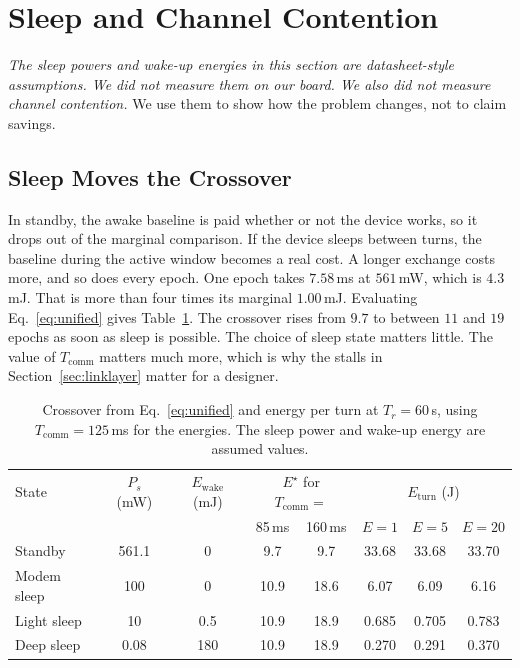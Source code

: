 \documentclass[journal]{IEEEtran}
\newcommand{\Estar}{E^{\star}}
\begin{document}
\section{Sleep and Channel Contention}
\label{sec:sleepcont}
\emph{The sleep powers and wake-up energies in this section are datasheet-style assumptions. We did not measure them on our board. We also did not measure channel contention.} We use them to show how the problem changes, not to claim savings.

\subsection{Sleep Moves the Crossover}
In standby, the awake baseline is paid whether or not the device works, so it drops out of the marginal comparison. If the device sleeps between turns, the baseline during the active window becomes a real cost. A longer exchange costs more, and so does every epoch. One epoch takes $7.58$\,ms at $561$\,mW, which is $4.3$\,mJ. That is more than four times its marginal $1.00$\,mJ. Evaluating Eq.~\eqref{eq:unified} gives Table~\ref{tab:sleep}. The crossover rises from $9.7$ to between $11$ and $19$ epochs as soon as sleep is possible. The choice of sleep state matters little. The value of $T_{\mathrm{comm}}$ matters much more, which is why the stalls in Section~\ref{sec:linklayer} matter for a designer.

\begin{table}[t]
\centering
\caption{Crossover from Eq.~\eqref{eq:unified} and energy per turn at $T_r=60$\,s, using $T_{\mathrm{comm}}=125$\,ms for the energies. The sleep power and wake-up energy are assumed values.}
\label{tab:sleep}
\scriptsize
\setlength{\tabcolsep}{2pt}
\begin{tabular}{lccccccc}
\toprule
State & $P_s$ (mW) & $E_{\mathrm{wake}}$ (mJ) & \multicolumn{2}{c}{$\Estar$ for $T_{\mathrm{comm}}=$} & \multicolumn{3}{c}{$E_{\mathrm{turn}}$ (J)} \\
 & & & 85\,ms & 160\,ms & $E{=}1$ & $E{=}5$ & $E{=}20$ \\
\midrule
Standby & 561.1 & 0 & 9.7 & 9.7 & 33.68 & 33.68 & 33.70 \\
Modem sleep & 100 & 0 & 10.9 & 18.6 & 6.07 & 6.09 & 6.16 \\
Light sleep & 10 & 0.5 & 10.9 & 18.9 & 0.685 & 0.705 & 0.783 \\
Deep sleep & 0.08 & 180 & 10.9 & 18.9 & 0.270 & 0.291 & 0.370 \\
\bottomrule
\end{tabular}
\end{table}
\end{document}

